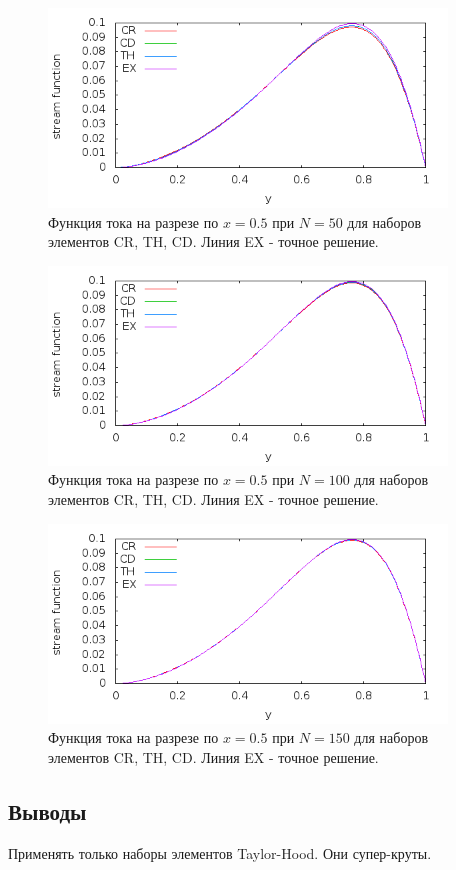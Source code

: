 \documentclass[12pt]{article}
\begin{document}
\begin{figure}
	\begin{center}
		\includegraphics[width=400px]{pics/psi_50}
		\caption{Функция тока на разрезе по $x=0.5$ при $N=50$ для наборов элементов CR, TH, CD. Линия EX - точное решение.}
		\label{fg:psi_50}
	\end{center}
\end{figure}

\begin{figure}
	\begin{center}
		\includegraphics[width=400px]{pics/psi_100}
		\caption{Функция тока на разрезе по $x=0.5$ при $N=100$ для наборов элементов CR, TH, CD. Линия EX - точное решение.}
		\label{fg:psi_100}
	\end{center}
\end{figure}

\begin{figure}
	\begin{center}
		\includegraphics[width=400px]{pics/psi_150}
		\caption{Функция тока на разрезе по $x=0.5$ при $N=150$ для наборов элементов CR, TH, CD. Линия EX - точное решение.}
		\label{fg:psi_150}
	\end{center}
\end{figure}

\newpage
\subsection{Выводы}
Применять только наборы элементов Taylor-Hood. Они супер-круты.
\end{document}
